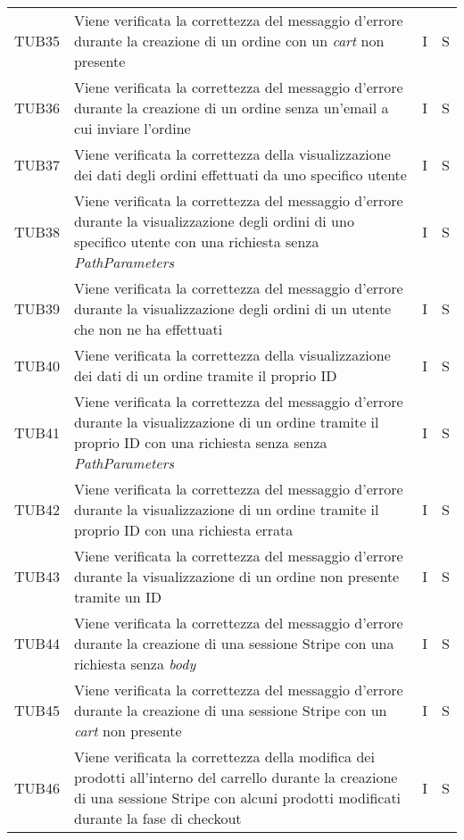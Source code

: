 {\begin{longtable}{C{2cm} C{9.6cm} C{1.5cm} C{1cm}}
TUB35 & Viene verificata la correttezza del messaggio d'errore durante la creazione di un ordine con un \textit{cart} non presente & I & S\\

TUB36 & Viene verificata la correttezza del messaggio d'errore durante la creazione di un ordine senza un'email a cui inviare l'ordine & I & S\\

TUB37 & Viene verificata la correttezza della visualizzazione dei dati degli ordini effettuati da uno specifico utente & I & S\\

TUB38 & Viene verificata la correttezza del messaggio d'errore durante la visualizzazione degli ordini di uno specifico utente con una richiesta senza \textit{PathParameters} & I & S\\

TUB39 & Viene verificata la correttezza del messaggio d'errore durante la visualizzazione degli ordini di un utente che non ne ha effettuati & I & S\\

TUB40 & Viene verificata la correttezza della visualizzazione dei dati di un ordine tramite il proprio ID & I & S\\

TUB41 & Viene verificata la correttezza del messaggio d'errore durante la visualizzazione di un ordine tramite il proprio ID con una richiesta senza senza \textit{PathParameters} & I & S\\

TUB42 & Viene verificata la correttezza del messaggio d'errore durante la visualizzazione di un ordine tramite il proprio ID con una richiesta errata & I & S\\

TUB43 & Viene verificata la correttezza del messaggio d'errore durante la visualizzazione di un ordine non presente tramite un ID & I & S\\

TUB44 & Viene verificata la correttezza del messaggio d'errore durante la creazione di una sessione Stripe con una richiesta senza \textit{body} & I & S\\

TUB45 & Viene verificata la correttezza del messaggio d'errore durante la creazione di una sessione Stripe con un \textit{cart} non presente & I & S\\


TUB46 & Viene verificata la correttezza della modifica dei prodotti all'interno del carrello durante la creazione di una sessione Stripe con alcuni prodotti modificati durante la fase di checkout & I & S\\


\end{longtable}}
